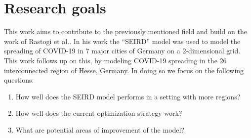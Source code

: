 \section{Research goals}
This work aims to contribute to the previously mentioned field
and build on the work of Rastogi et al.\cite{Rastogi}. In his work the ``SEIRD'' model\cite{Wittum1,Wittum2} was used to
model the spreading of COVID-19 in 7 major cities of Germany on a 2-dimensional grid. This work follows up on this, by
modeling COVID-19 spreading in the 26 interconnected region of Hesse, Germany. In doing so we focus on the following questions.

\begin{enumerate}
	\item How well does the SEIRD model performs in a setting with more regions?
	\item How well does the current optimization strategy work?
	\item What are potential areas of improvement of the model?
\end{enumerate}

